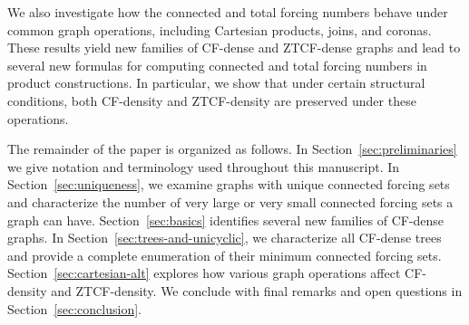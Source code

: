 \documentclass[11pt]{article}
\theoremstyle{definition}
\newcommand{\1}{\vspace{0.1cm}}
\newcommand{\2}{\vspace{0.2cm}}
\newcommand{\3}{\vspace{0.3cm}}
\begin{document}


We also investigate how the connected and total forcing numbers behave under common graph operations, including Cartesian products, joins, and coronas. These results yield new families of CF-dense and ZTCF-dense graphs and lead to several new formulas for computing connected and total forcing numbers in product constructions. In particular, we show that under certain structural conditions, both CF-density and ZTCF-density are preserved under these operations.

The remainder of the paper is organized as follows. In Section~\ref{sec:preliminaries} we give notation and terminology used throughout this manuscript. In Section~\ref{sec:uniqueness}, we examine graphs with unique connected forcing sets and characterize the number of very large or very small connected forcing sets a graph can have. Section~\ref{sec:basics} identifies several new families of CF-dense graphs. In Section~\ref{sec:trees-and-unicyclic}, we characterize all CF-dense trees and provide a complete enumeration of their minimum connected forcing sets. Section~\ref{sec:cartesian-alt} explores how various graph operations affect CF-density and ZTCF-density. We conclude with final remarks and open questions in Section~\ref{sec:conclusion}.

\end{document}
